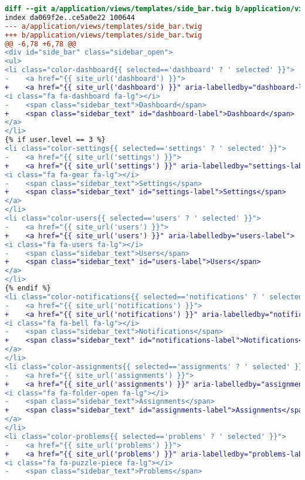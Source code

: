\begin{itemize}
\begin{lstlisting}[language=diff, caption=Perubahan untuk mematuhi kriteria 2.4.4, label=lst_2.4.4, basicstyle=\ttfamily, frame=single,
columns=fullflexible, keepspaces=true, breaklines=true]
diff --git a/application/views/templates/side_bar.twig b/application/views/templates/side_bar.twig
index da069f2e..ce5a0e22 100644
--- a/application/views/templates/side_bar.twig
+++ b/application/views/templates/side_bar.twig
@@ -6,78 +6,78 @@
<div id="side_bar" class="sidebar_open">
<ul>
<li class="color-dashboard{{ selected=='dashboard' ? ' selected' }}">
-    <a href="{{ site_url('dashboard') }}">
+    <a href="{{ site_url('dashboard') }}" aria-labelledby="dashboard-label">
<i class="fa fa-dashboard fa-lg"></i>
-    <span class="sidebar_text">Dashboard</span>
+    <span class="sidebar_text" id="dashboard-label">Dashboard</span>
</a>
</li>
{% if user.level == 3 %}
<li class="color-settings{{ selected=='settings' ? ' selected' }}">
-    <a href="{{ site_url('settings') }}">
+    <a href="{{ site_url('settings') }}" aria-labelledby="settings-label">
<i class="fa fa-gear fa-lg"></i>
-    <span class="sidebar_text">Settings</span>
+    <span class="sidebar_text" id="settings-label">Settings</span>
</a>
</li>
<li class="color-users{{ selected=='users' ? ' selected' }}">
-    <a href="{{ site_url('users') }}">
+    <a href="{{ site_url('users') }}" aria-labelledby="users-label">
<i class="fa fa-users fa-lg"></i>
-    <span class="sidebar_text">Users</span>
+    <span class="sidebar_text" id="users-label">Users</span>
</a>
</li>
{% endif %}
<li class="color-notifications{{ selected=='notifications' ? ' selected' }}">
-    <a href="{{ site_url('notifications') }}">
+    <a href="{{ site_url('notifications') }}" aria-labelledby="notifications-label">
<i class="fa fa-bell fa-lg"></i>
-    <span class="sidebar_text">Notifications</span>
+    <span class="sidebar_text" id="notifications-label">Notifications</span>
</a>
</li>
<li class="color-assignments{{ selected=='assignments' ? ' selected' }}">
-    <a href="{{ site_url('assignments') }}">
+    <a href="{{ site_url('assignments') }}" aria-labelledby="assignments-label">
<i class="fa fa-folder-open fa-lg"></i>
-    <span class="sidebar_text">Assignments</span>
+    <span class="sidebar_text" id="assignments-label">Assignments</span>
</a>
</li>
<li class="color-problems{{ selected=='problems' ? ' selected' }}">
-    <a href="{{ site_url('problems') }}">
+    <a href="{{ site_url('problems') }}" aria-labelledby="problems-label">
<i class="fa fa-puzzle-piece fa-lg"></i>
-    <span class="sidebar_text">Problems</span>

\end{lstlisting}
\end{itemize}
